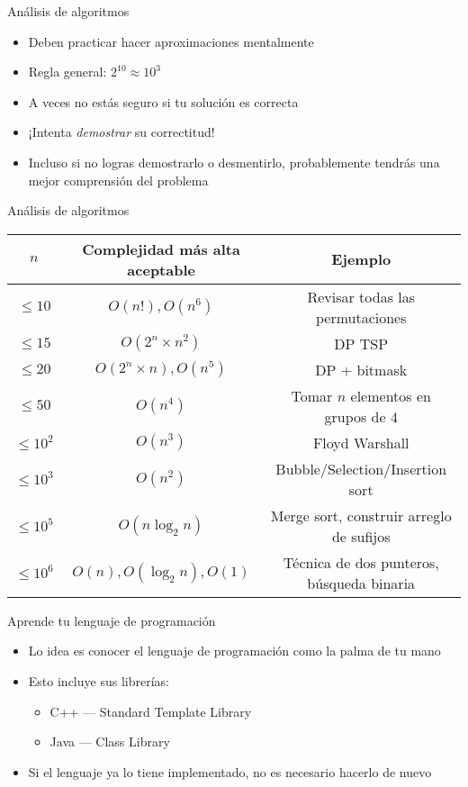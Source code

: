 \documentclass[10pt]{beamer}
\newcommand{\bi}{\begin{itemize}}
\newcommand{\ei}{\end{itemize}}
\begin{document}
\begin{frame}{Análisis de algoritmos}
    \bi
        \item Deben practicar hacer aproximaciones mentalmente
        \item Regla general: $2^{10} \approx 10^{3}$
        \vspace{10pt}
        \item A veces no estás seguro si tu solución es correcta
        \item ¡Intenta \textit{demostrar} su correctitud!
        \item Incluso si no logras demostrarlo o desmentirlo, probablemente tendrás una mejor comprensión del problema
        \vspace{20pt}
    \ei
\end{frame}

\begin{frame}{Análisis de algoritmos}
    \vspace{10pt}
{
    \scriptsize
    \begin{center}
    \begin{tabular}{c|c|c}
        $n$ & Complejidad más alta aceptable & Ejemplo \\
        \hline
        $\leq 10$ & $O(n!), O(n^6)$ & Revisar todas las permutaciones \\
        $\leq 15$ & $O(2^n \times n^2)$ & DP TSP \\
        $\leq 20$ & $O(2^n \times n), O(n^5)$ & DP + bitmask \\
        $\leq 50$ & $O(n^4)$ & Tomar $n$ elementos en grupos de $4$ \\
        $\leq 10^2$ & $O(n^3)$ & Floyd Warshall \\
        $\leq 10^3$ & $O(n^2)$ & Bubble/Selection/Insertion sort \\
        $\leq 10^5$ & $O(n\log_2{n})$ & Merge sort, construir arreglo de sufijos \\
        $\leq 10^6$ & $O(n), O(\log_2{n}), O(1)$ & Técnica de dos punteros, búsqueda binaria \\
    \end{tabular}
    \end{center}
}
\end{frame}

\begin{frame}{Aprende tu lenguaje de programación}
    \bi
        \item Lo idea es conocer el lenguaje de programación como la palma de tu mano
        \item Esto incluye sus librerías:
            \bi
                \item C++ --- Standard Template Library
                \item Java --- Class Library
            \ei
        \item Si el lenguaje ya lo tiene implementado, no es necesario hacerlo de nuevo
    \ei
\end{frame}
\end{document}
